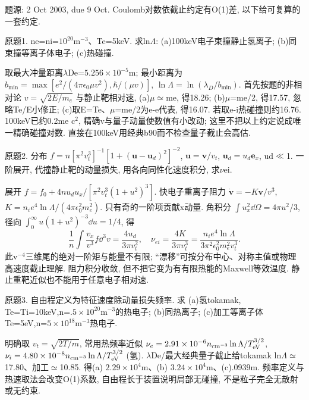 题源: 2 Oct 2003, due 9 Oct. Coulomb对数依截止约定有O(1)差, 以下给可复算的一套约定.
\begin{exercise}\label{ex:03-4-1}
原题1. ne=ni=$10^{20}$m$^{-3}$、Te=5keV. 求ln\ensuremath{\Lambda}: (a)100keV电子束撞静止氢离子; (b)同束撞等离子体电子; (c)热碰撞.
\end{exercise}
\begin{solution}
取最大冲量距离\ensuremath{\lambda}De=$5.256\times10^{-5}$m; 最小距离为 $b_{\min}=\max[e^2/(4\pi\epsilon_0\mu v^2),\hbar/(\mu v)]$, $\ln\Lambda=\ln(\lambda_D/b_{\min})$. 首先按题的非相对论 $v=\sqrt{2E/m_e}$ 与静止靶相对速, (a)\ensuremath{\mu}\ensuremath{\simeq}me, 得18.26; (b)\ensuremath{\mu}=me/2, 得17.57, 忽略Te/E小修正; (c)取E=Te、\ensuremath{\mu}=me/2为e-e代表, 得16.07. 若取e-i热碰撞则约16.76. 100keV已约0.2me c\ensuremath{{}^{2}}, 精确v与量子动量使数值有小改动; 这里不把以上约定说成唯一精确碰撞对数. 直接在100keV用经典b90而不检查量子截止会高估.
\end{solution}
\begin{exercise}\label{ex:03-4-2}
原题2. 分布 $f=n[\pi^2v_t^3]^{-1}[1+(\mathbf u-\mathbf u_d)^2]^{-2}$, $\mathbf u=\mathbf v/v_t$, $\mathbf u_d=u_d\mathbf e_x$, ud\ensuremath{\ll}1. 一阶展开, 代撞静止靶的动量损失, 用各向同性化速度积分, 求\ensuremath{\nu}ei.
\end{exercise}
\begin{solution}
展开 $f=f_0+4nu_du_x/[\pi^2v_t^3(1+u^2)^3]$. 快电子重离子阻力 $\dot{\mathbf v}=-K\mathbf v/v^3$, $K=n_ie^4\ln\Lambda/(4\pi\epsilon_0^2m_e^2)$. 只有奇的一阶项贡献x动量. 角积分 $\int u_x^2\dd\Omega=4\pi u^2/3$, 径向 $\int_0^\infty u(1+u^2)^{-3}\dd u=1/4$, 得
\begin{equation}
 \frac1n\int\frac{v_x}{v^3}f\dd^3v=\frac{4u_d}{3\pi v_t^2},\quad
 \nu_{ei}=\frac{4K}{3\pi v_t^3}=\frac{n_ie^4\ln\Lambda}{3\pi^2\epsilon_0^2m_e^2v_t^3}.
\end{equation}
此v$^{-4}$三维尾的绝对一阶矩与能量不有限; ``漂移''可按分布中心、对称主值或物理高速度截止理解. 阻力积分收敛, 但不把它变为有有限热能的Maxwell等效温度. 静止重靶近似也不能用于任意电子相对速.
\end{solution}
\begin{exercise}\label{ex:03-4-3}
原题3. 自由程定义为特征速度除动量损失频率. 求 (a)氢tokamak, Te=Ti=10keV,n=$.5\times10^{20}$m$^{-3}$的热电子; (b)同热离子; (c)加工等离子体Te=5eV,n=$5\times10^{18}$m$^{-3}$热电子.
\end{exercise}
\begin{solution}
明确取 $v_t=\sqrt{2T/m}$, 常用热频率近似 $\nu_e=2.91\times10^{-6}n_{\rm cm^{-3}}\ln\Lambda/T_{\rm eV}^{3/2}$, $\nu_i=4.80\times10^{-8}n_{\rm cm^{-3}}\ln\Lambda/T_{\rm eV}^{3/2}$ (氢). \ensuremath{\lambda}De/最大经典量子截止给tokamak ln\ensuremath{\Lambda}\ensuremath{\simeq}17.80、加工\ensuremath{\simeq}10.85. 得(a) $2.29\times10^4$m、(b) $3.24\times10^4$m、(c).0939m. 频率定义与热速取法会改变O(1)系数, 自由程长于装置说明局部无碰撞, 不是粒子完全无散射或无约束.
\end{solution}
